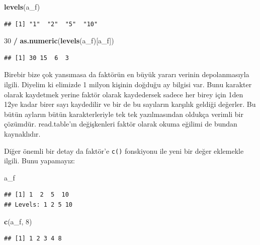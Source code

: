 \documentclass[
]{book}
\newenvironment{Shaded}{\begin{snugshade}}{\end{snugshade}}
\newcommand{\DecValTok}[1]{\textcolor[rgb]{0.00,0.00,0.81}{#1}}
\newcommand{\KeywordTok}[1]{\textcolor[rgb]{0.13,0.29,0.53}{\textbf{#1}}}
\newcommand{\NormalTok}[1]{#1}
\newcommand{\OperatorTok}[1]{\textcolor[rgb]{0.81,0.36,0.00}{\textbf{#1}}}
\newcommand{\StringTok}[1]{\textcolor[rgb]{0.31,0.60,0.02}{#1}}
\begin{document}
\begin{Shaded}
\begin{Highlighting}[]
\KeywordTok{levels}\NormalTok{(a\_f)}
\end{Highlighting}
\end{Shaded}

\begin{verbatim}
## [1] "1"  "2"  "5"  "10"
\end{verbatim}

\begin{Shaded}
\begin{Highlighting}[]
\DecValTok{30} \OperatorTok{/}\StringTok{ }\KeywordTok{as.numeric}\NormalTok{(}\KeywordTok{levels}\NormalTok{(a\_f)[a\_f])}
\end{Highlighting}
\end{Shaded}

\begin{verbatim}
## [1] 30 15  6  3
\end{verbatim}

Birebir bize çok yansımasa da faktörün en büyük yararı verinin depolanmasıyla ilgili. Diyelim ki elimizde 1 milyon kişinin doğduğu ay bilgisi var. Bunu karakter olarak kaydetmek yerine faktör olarak kaydedersek sadece her birey için 1den 12ye kadar birer sayı kaydedilir ve bir de bu sayıların karşılık geldiği değerler. Bu bütün ayların bütün karakterleriyle tek tek yazılmasından oldukça verimli bir çözümdür. read.table'ın değişkenleri faktör olarak okuma eğilimi de bundan kaynaklıdır.

Diğer önemli bir detay da faktör'e \texttt{c()} fonskiyonu ile yeni bir değer eklemekle ilgili. Bunu yapamayız:

\begin{Shaded}
\begin{Highlighting}[]
\NormalTok{a\_f}
\end{Highlighting}
\end{Shaded}

\begin{verbatim}
## [1] 1  2  5  10
## Levels: 1 2 5 10
\end{verbatim}

\begin{Shaded}
\begin{Highlighting}[]
\KeywordTok{c}\NormalTok{(a\_f, }\DecValTok{8}\NormalTok{)}
\end{Highlighting}
\end{Shaded}

\begin{verbatim}
## [1] 1 2 3 4 8
\end{verbatim}
\end{document}
